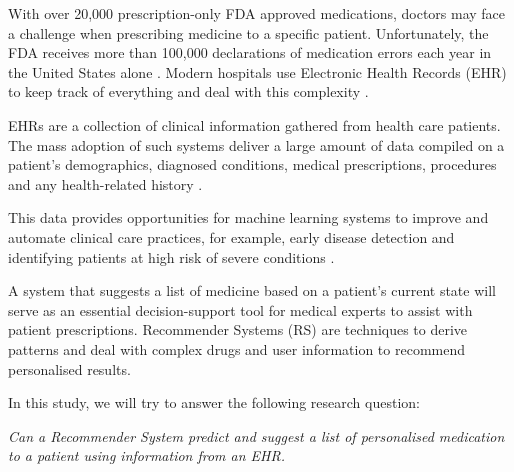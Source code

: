 With over 20,000 prescription-only FDA approved medications,
doctors may face a challenge when prescribing medicine to a
specific patient. Unfortunately, the FDA receives more than
100,000 declarations of medication errors each year in the United
States alone \cite{FDA2021}. Modern hospitals use Electronic
Health Records (EHR) to keep track of everything and deal with
this complexity \cite{Kim2019}. 

EHRs are a collection of clinical information gathered
from health care patients. The mass adoption of such
systems deliver a large amount of data compiled on a
patient's demographics, diagnosed conditions, medical
prescriptions, procedures and any health-related history
\cite{Kim2019}.


This data provides opportunities for machine learning systems to improve and
automate clinical care practices, for example, early disease detection and
identifying patients at high risk of severe conditions
\cite{10.2307/20720782, Juhn2019}.


A system that suggests a list of medicine based on a patient's current state will serve as an essential decision-support tool for medical experts 
to assist with patient prescriptions. Recommender Systems (RS) are
techniques to derive patterns and deal with complex drugs and user
information to recommend personalised results.


In this study, we will try to answer the following research question:
\begin{center}
\textit{Can a Recommender System predict and suggest a list of personalised medication to
a patient using information from an EHR.}
\end{center}



